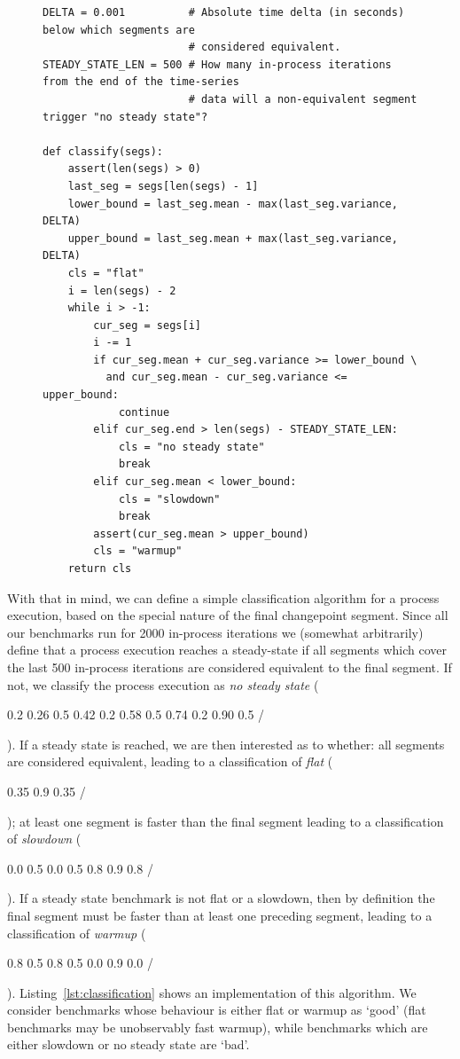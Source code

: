 \documentclass[acmsmall]{acmart}\settopmatter{printfolios=true}
\newcommand{\numiterations}{2000\xspace}
\DeclareRobustCommand{\flatc}{%
\setlength{\sparklinethickness}{0.4pt}%
\begin{sparkline}{1.5}
\spark 0.1 0.35
       0.9 0.35
       /%
\end{sparkline}\xspace%
}
\DeclareRobustCommand{\nosteadystate}{%
\setlength{\sparklinethickness}{0.4pt}%
\begin{sparkline}{1.5}
\spark 0.1 0.2
       0.26 0.5
       0.42 0.2
       0.58 0.5
       0.74 0.2
       0.90 0.5
       /%
\end{sparkline}\xspace%
}
\DeclareRobustCommand{\warmup}{%
\setlength{\sparklinethickness}{0.4pt}%
\begin{sparkline}{1.5}
\spark 0.1 0.8
       0.5 0.8
       0.5 0.0
       0.9 0.0
       /%
\end{sparkline}\xspace%
}
\DeclareRobustCommand{\slowdown}{%
\setlength{\sparklinethickness}{0.4pt}%
\begin{sparkline}{1.5}
\spark 0.1 0.0
       0.5 0.0
       0.5 0.8
       0.9 0.8
       /%
\end{sparkline}\xspace%
}
\begin{document}
\begin{figure}[t]
\begin{lstlisting}[label=lst:classification, xleftmargin=0cm, caption={The
classification algorithm for an individual process execution. Given an ordered
list of segments (each with "mean", "variance", and "end" attributes, the latter
being the absolute index of the last iteration in the segment)
this function returns a string classifying the run sequence's warmup style.}]
DELTA = 0.001          # Absolute time delta (in seconds) below which segments are
                       # considered equivalent.
STEADY_STATE_LEN = 500 # How many in-process iterations from the end of the time-series
                       # data will a non-equivalent segment trigger "no steady state"?

def classify(segs):
    assert(len(segs) > 0)
    last_seg = segs[len(segs) - 1]
    lower_bound = last_seg.mean - max(last_seg.variance, DELTA)
    upper_bound = last_seg.mean + max(last_seg.variance, DELTA)
    cls = "flat"
    i = len(segs) - 2
    while i > -1:
        cur_seg = segs[i]
        i -= 1
        if cur_seg.mean + cur_seg.variance >= lower_bound \
          and cur_seg.mean - cur_seg.variance <= upper_bound:
            continue
        elif cur_seg.end > len(segs) - STEADY_STATE_LEN:
            cls = "no steady state"
            break
        elif cur_seg.mean < lower_bound:
            cls = "slowdown"
            break
        assert(cur_seg.mean > upper_bound)
        cls = "warmup"
    return cls
\end{lstlisting}
\vspace{-.75cm}
\end{figure}

With that in mind, we can define a simple classification algorithm for a process
execution, based on the special nature of the final changepoint segment. Since all our benchmarks run
for \numiterations in-process iterations we (somewhat arbitrarily) define that a process
execution reaches a steady-state if all segments which cover the last 500
in-process iterations are considered equivalent to the final segment. If
not, we classify the process execution as \emph{no steady state} (\nosteadystate).
If a steady state is reached, we are then interested as to whether: all
segments are considered equivalent, leading to a classification of \emph{flat} (\flatc);
at least one segment is faster than the final segment leading to a classification
of \emph{slowdown} (\slowdown). If a steady state benchmark is not flat or a
slowdown, then by definition the final segment must be faster than
at least one preceding segment, leading to a classification of \emph{warmup} (\warmup).
Listing~\ref{lst:classification} shows an implementation of this algorithm.
We consider benchmarks whose behaviour is either flat or warmup
as `good' (flat benchmarks may be unobservably fast warmup), while
benchmarks which are either slowdown or no steady state are `bad'.
\end{document}
